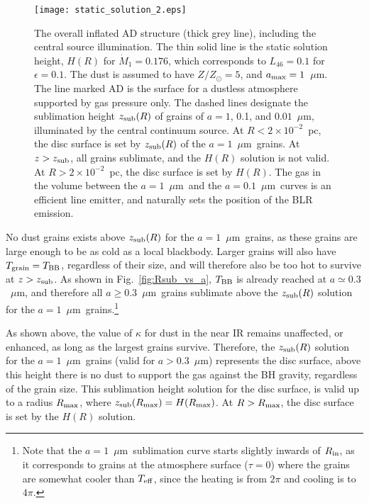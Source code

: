 \documentclass[a4paper,fleqn,usenatbib]{mnras}
\newcommand{\mdot}{\dot{M}}
\newcommand{\amax}{\mbox{$a_{\rm max}$}}
\newcommand{\mic}{\mbox{$\mu$m}}
\newcommand{\Tgr}{\mbox{$T_{\rm grain}$}}
\begin{document}
\begin{figure}
\texttt{[image: static\_solution\_2.eps]}
\caption{The overall inflated AD structure (thick grey line), 
including the central source illumination. The thin solid line is the
static solution height, $H(R)$ for $\mdot_1=0.176$, which corresponds to $L_{46}=0.1$ for $\epsilon=0.1$.
The dust is assumed to have $Z/Z_{\odot}=5$, and $\amax=1$~\mic. The line marked AD is the surface for a dustless atmosphere supported by gas pressure only. The dashed lines designate the
sublimation height $z_{\rm sub}(R)$ of grains of $a=1$, 0.1, and $0.01$~\mic, illuminated by the central continuum source. At $R<2\times 10^{-2}$~pc, the disc surface is set by $z_{\rm sub}(R)$ 
of the $a=1$~\mic\ grains. 
At $z>z_{\rm sub}$, all grains sublimate, and the $H(R)$ solution is not valid. At $R>2\times 10^{-2}$~pc, the disc surface is set by
$H(R)$. The gas in the volume between the $a=1$~\mic\ and the $a=0.1$~\mic\ curves is an efficient line emitter,
and naturally sets the position of the BLR emission.}
\label{fig:static_solution}
\end{figure}

No dust grains exists above $z_{\rm sub}(R)$ for the 
$a=1$~\mic\ grains, as these grains are large enough to be as cold as a local blackbody. 
Larger grains will also have $\Tgr=T_{\rm BB}$, regardless of their size, and will therefore also
be too hot to survive at $z>z_{\rm sub}$. As shown in Fig.~\ref{fig:Rsub_vs_a}, $T_{\rm BB}$ is already reached
at $a \simeq 0.3$~\mic, and therefore all $a\ge 0.3$~\mic\ grains sublimate above the $z_{\rm sub}(R)$ solution
for the $a=1$~\mic\ grains.\footnote{Note that the $a=1$~\mic\ sublimation curve starts slightly inwards of 
$R_{\rm in}$, as it corresponds to grains at the atmosphere surface ($\tau=0$) where the grains are somewhat
cooler than $T_{\rm eff}$, since the heating is from $2\pi$ and cooling is to $4\pi$.}

As shown above, the value of $\kappa$ for dust in the near IR remains unaffected, or enhanced,
as long as the largest grains survive. Therefore, the $z_{\rm sub}(R)$ solution for the
$a=1$~\mic\ grains (valid for $a>0.3$~\mic) represents the disc surface, above this height there is no dust
to support the gas against the BH gravity, regardless of the grain size. 
This sublimation height solution for the disc surface, is valid up to a radius $R_{\rm max}$, where 
$z_{\rm sub}(R_{\rm max})=H(R_{\rm max})$. At $R>R_{\rm max}$, the disc surface is set by the $H(R)$ 
solution. 
\end{document}
